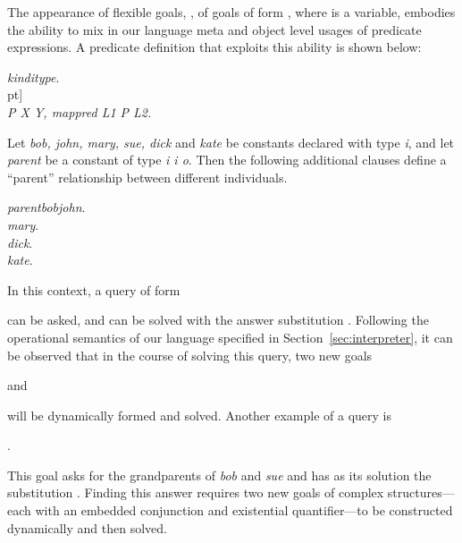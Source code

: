 The appearance of flexible goals, \ie, of goals of form
, where
 is a variable, embodies the ability to mix in our language
meta and object level usages of predicate expressions.
A predicate definition that exploits this ability is shown below:
\begin{tabbing}
\dquad\dquad\={\it kind}\dquad\dquad\={\it i}\dquad\dquad\={\it type}.\\
             \5pt]
             \\
              {\it P X Y, mappred L1 P L2.}
\end{tabbing}
Let {\it bob, john, mary, sue, dick} and {\it kate} be constants declared
with type {\it i}, and let {\it parent} be a constant of type
{\it i  i  o}. Then the following additional clauses
define a ``parent'' relationship between different individuals.
\begin{tabbing}
\dquad\dquad\={\it parent}\dquad\dquad\={\it bob}\dquad\={\it john}.\\
            \> {\it mary}.\\
            \> {\it dick}.\\
            \> {\it kate}.
\end{tabbing}
In this context, a query of form
\begin{tabbing}
\dquad{}
\end{tabbing}
can be asked, and can be solved with the answer
substitution .
Following the operational semantics of our language specified in
Section~\ref{sec:interpreter}, it can be observed that in the course of
solving this query, two new goals
\begin{tabbing}
\dquad{}\dquad and
\end{tabbing}
will be dynamically formed and solved. Another example of a query is
\begin{tabbing}
.
\end{tabbing}
This goal asks for the grandparents of {\it bob} and {\it sue} and has as
its solution the substitution . Finding this
answer requires two new goals of complex structures---each with an
embedded conjunction and existential quantifier---to be constructed
dynamically and then solved.

